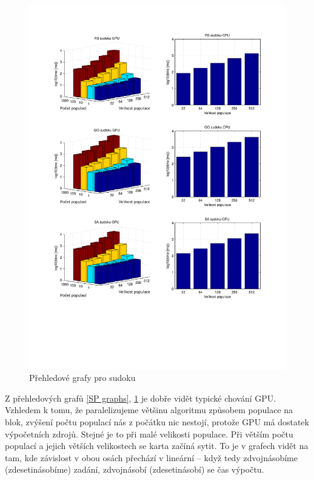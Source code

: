 \begin{figure}[h!]
\begin{center}
  \includegraphics[width=\textwidth]{img/graphsSU}
  \caption{Přehledové grafy pro sudoku}\label{SU graphs}
  \end{center}
\end{figure}
\clearpage

Z přehledových grafů \ref{SP graphs}, \ref{SU graphs} je dobře vidět typické chování GPU. Vzhledem k tomu, že paralelizujeme většinu algoritmu způsobem populace na blok, zvýšení počtu populací nás z počátku nic nestojí, protože GPU má dostatek výpočetních zdrojů. Stejné je to při malé velikosti populace. Při větším počtu populací a jejich větších velikostech se karta začíná sytit. To je v grafech vidět na tam, kde závislost v obou osách přechází v lineární -- když tedy zdvojnásobíme (zdesetinásobíme) zadání, zdvojnásobí (zdesetinásobí) se čas výpočtu. 

